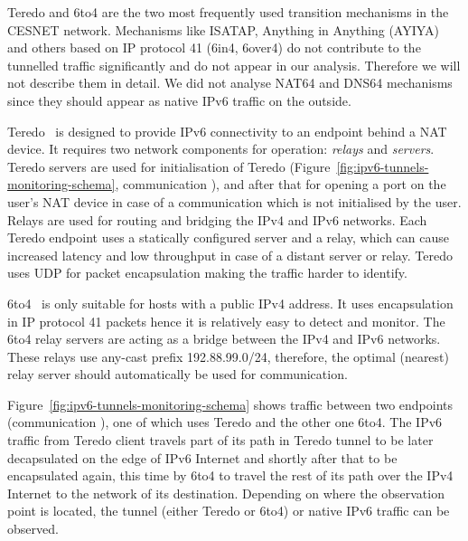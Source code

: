 Teredo and 6to4 are the two most frequently used transition mechanisms in the CESNET network. Mechanisms like ISATAP, Anything in Anything (AYIYA) and others based on IP protocol 41 (6in4, 6over4) do not contribute to the tunnelled traffic significantly and do not appear in our analysis. Therefore we will not describe them in detail. We did not analyse NAT64 and DNS64 mechanisms since they should appear as native IPv6 traffic on the outside.

Teredo~\cite{rfc4380} is designed to provide IPv6 connectivity to an endpoint behind a NAT device. It requires two network components for operation: \emph{relays} and \emph{servers}. Teredo servers are used for initialisation of Teredo (Figure~\ref{fig:ipv6-tunnels-monitoring-schema}, communication ), and after that for opening a port on the user's NAT device in case of a communication which is not initialised by the user. Relays are used for routing and bridging the IPv4 and IPv6 networks. Each Teredo endpoint uses a statically configured server and a relay, which can cause increased latency and low throughput in case of a distant server or relay. Teredo uses UDP for packet encapsulation making the traffic harder to identify.

6to4~\cite{rfc3056} is only suitable for hosts with a public IPv4 address. It uses encapsulation in IP protocol 41 packets hence it is relatively easy to detect and monitor. The 6to4 relay servers are acting as a bridge between the IPv4 and IPv6 networks. These relays use any-cast prefix 192.88.99.0/24, therefore, the optimal (nearest) relay server should automatically be used for communication.

Figure~\ref{fig:ipv6-tunnels-monitoring-schema} shows traffic between two endpoints (communication ), one of which uses Teredo and the other one 6to4. The IPv6 traffic from Teredo client travels part of its path in Teredo tunnel to be later decapsulated on the edge of IPv6 Internet and shortly after that to be encapsulated again, this time by 6to4 to travel the rest of its path over the IPv4 Internet to the network of its destination. Depending on where the observation point is located, the tunnel (either Teredo or 6to4) or native IPv6 traffic can be observed.

